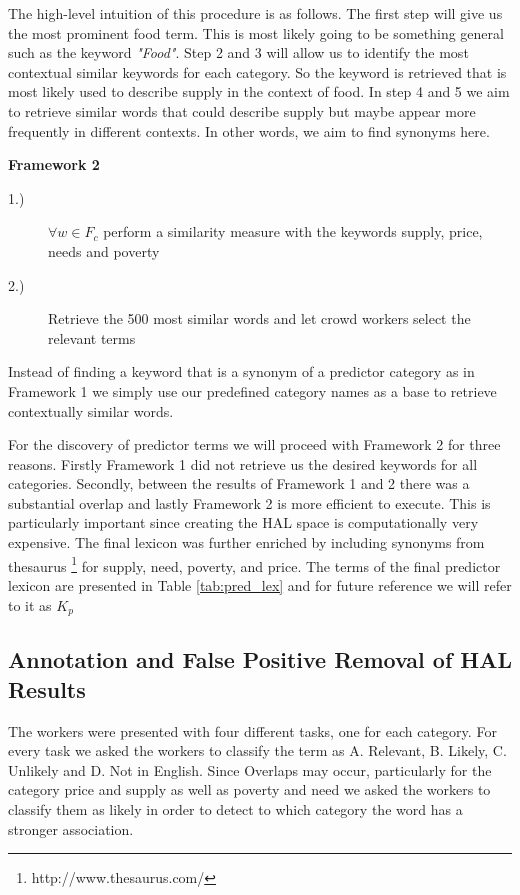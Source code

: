 The high-level intuition of this procedure is as follows. The first step will give us the most prominent food term. This is most likely going to be something general such as the keyword \emph{"Food"}. Step 2 and 3 will allow us to identify the most contextual similar keywords for each category. So the keyword is retrieved that is most likely used to describe supply in the context of food. In step 4 and 5 we aim to retrieve similar words that could describe supply but maybe appear more frequently in different contexts. In other words, we aim to find synonyms here.   


\textbf{Framework 2}


\begin{description}
   \item[1.)] $\forall w \in F_c $ perform a similarity measure with the keywords supply, price, needs and poverty
  \item[2.)]  Retrieve the 500 most similar words and let crowd workers select the relevant terms  
  \end{description}

Instead of finding a keyword that is a synonym of a predictor category as in Framework 1 we simply use our predefined category names as a base to retrieve contextually similar words. 

For the discovery of predictor terms we will proceed with Framework 2 for three reasons. Firstly Framework 1 did not retrieve us the desired keywords for all categories. Secondly, between the results of Framework 1 and 2 there was a substantial overlap and lastly Framework 2 is more efficient to execute. This is particularly important since creating the HAL space is computationally very expensive. The final lexicon was further enriched by including synonyms from thesaurus \footnote{http://www.thesaurus.com/} for supply, need, poverty, and price. The terms of the final predictor lexicon are presented in Table \ref{tab:pred_lex} and for future reference we will refer to it as $K_p$




\subsection{Annotation and False Positive Removal of HAL Results}

The workers were presented with four different tasks, one for each category. For every task we asked the workers to classify the term as A. Relevant, B. Likely, C. Unlikely and D. Not in English. Since Overlaps may occur, particularly for the category price and supply as well as poverty and need we asked the workers to classify them as likely in order to detect to which category the word has a stronger association. 

